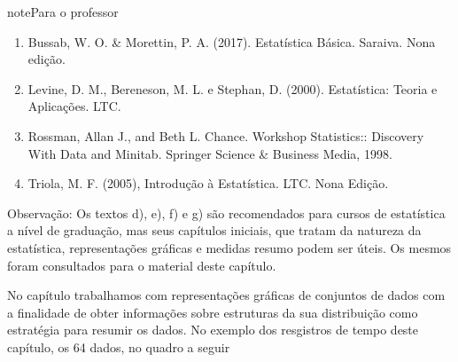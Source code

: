 \begin{sphinxadmonition}{note}{Para o professor}
\begin{enumerate}
\item {} 
Bussab, W. O. \& Morettin, P. A. (2017). Estatística Básica.  Saraiva. Nona edição.

\item {} 
Levine, D. M., Bereneson, M. L. e Stephan, D. (2000). Estatística: Teoria e Aplicações. LTC.

\item {} 
Rossman, Allan J., and Beth L. Chance. Workshop Statistics:: Discovery With Data and Minitab. Springer Science \& Business Media, 1998.

\item {} 
Triola, M. F. (2005), Introdução à Estatística. LTC. Nona Edição.

\end{enumerate}

Observação: Os textos d), e), f) e g) são recomendados para cursos de estatística a nível de graduação, mas seus capítulos iniciais, que tratam da natureza da estatística, representações gráficas e medidas resumo podem ser úteis. Os mesmos foram consultados para o material deste capítulo.
\end{sphinxadmonition}


\label{\detokenize{PE104-0:sec-explorando1}}\label{\detokenize{PE104-0:explorando-medidas-de-posicao}}\label{\detokenize{PE104-0::doc}}
No capítulo  trabalhamos com representações gráficas de conjuntos de dados com a finalidade de obter informações sobre estruturas da sua distribuição como estratégia para resumir os dados.
No exemplo dos resgistros de tempo deste capítulo, os 64 dados, no quadro a seguir


